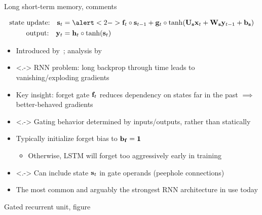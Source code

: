 \begin{frame}{Long short-term memory, comments}
    \begin{block}{}
        \vspace{-5mm}
        \begin{align*}
            \text{state update:} \quad \s_t &= \alert<2->{\f_t} \circ \s_{t-1} + \g_t \circ \tanh(\U_\s \x_t + \W_\s \y_{t-1} + \b_\s) \\
            \text{output:} \quad \y_t &= \h_t \circ \tanh(\s_t)
        \end{align*}
    \end{block}

    \begin{itemize}
        \item<+-> Introduced by~\citet{HochreiterNC97}; analysis by \citet{GreffIEEENNLS17}
        \item<.-> RNN{} problem: long backprop through time leads to vanishing/exploding gradients
        \item<+-> Key insight: \alert{forget gate $\mathbf{f}_t$} reduces dependency on states far in the past $\implies$ better-behaved gradients
        \item<.-> Gating behavior determined by inputs/outputs, rather than statically
        \item<+-> Typically initialize forget bias to $\mathbf{b}_{\mathbf{f}} = \mathbf{1}$~\citep{GersNC00,JozefowiczICML15}
        \begin{itemize}
            \item Otherwise, LSTM{} will forget too aggressively early in training
        \end{itemize}
        \item<.-> Can include state $\mathbf{s}_t$ in gate operands (peephole connections)
        \item<+-> The most common and arguably the strongest RNN{} architecture in use today \citep{JozefowiczICML15}
    \end{itemize}
\end{frame}

\begin{frame}{Gated recurrent unit, figure}
    \begin{center}
        \vspace{-7mm}
        
        \vspace{-7mm}
    \end{center}
\end{frame}

